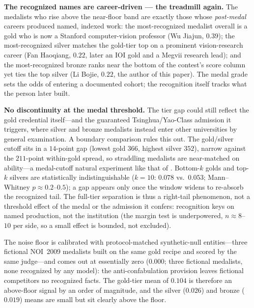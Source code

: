 \textbf{The recognized names are career-driven --- the treadmill again.} The medalists who rise above the near-floor band are exactly those whose \emph{post-medal} careers produced named, indexed work: the most-recognized medalist overall is a gold who is now a Stanford computer-vision professor (Wu Jiajun, $0.39$); the most-recognized silver matches the gold-tier top on a prominent vision-research career (Fan Haoqiang, $0.22$, later an IOI gold and a Megvii research lead); and the most-recognized bronze ranks near the bottom of the contest's score column yet ties the top silver (Li Bojie, $0.22$, the author of this paper). The medal grade sets the odds of entering a documented cohort; the recognition itself tracks what the person later built.

\textbf{No discontinuity at the medal threshold.} The tier gap could still reflect the gold credential itself---and the guaranteed Tsinghua/Yao-Class admission it triggers, where silver and bronze medalists instead enter other universities by general examination. A boundary comparison rules this out. The gold/silver cutoff sits in a $14$-point gap (lowest gold $366$, highest silver $352$), narrow against the $211$-point within-gold spread, so straddling medalists are near-matched on ability---a medal-cutoff natural experiment like that of \citet{agarwalGaule2020}. Bottom-$k$ golds and top-$k$ silvers are statistically indistinguishable ($k{=}10$: $0.078$ vs.\ $0.053$; Mann--Whitney $p \approx 0.2$--$0.5$); a gap appears only once the window widens to re-absorb the recognized tail. The full-tier separation is thus a right-tail phenomenon, not a threshold effect of the medal or the admission it confers: recognition keys on named production, not the institution (the margin test is underpowered, $n \approx 8$--$10$ per side, so a small effect is bounded, not excluded).

The noise floor is calibrated with protocol-matched synthetic-null entities---three fictional NOI~2009 medalists built on the same gold recipe and scored by the same judge---and comes out at essentially zero ($0.000$; three fictional medalists, none recognized by any model): the anti-confabulation provision leaves fictional competitors no recognized facts. The gold-tier mean of $0.104$ is therefore an above-floor signal by an order of magnitude, and the silver ($0.026$) and bronze ($0.019$) means are small but sit clearly above the floor.


